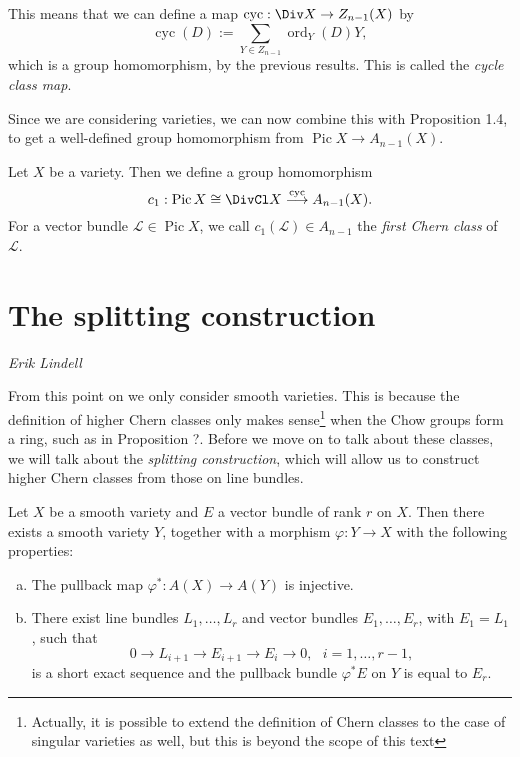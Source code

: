 \documentclass[a4paper,openany]{scrbook}
\DeclareMathOperator{\Pic}{Pic}
\DeclareMathOperator{\ord}{ord}
\newcommand{\chapterauthor}[1]{\hfill\emph{#1}\par\noindent}
\begin{document}
This means that we can define a map $\operatorname{cyc}:\Div X\to Z_{n-1}(X)$ by
$$\operatorname{cyc}(D):=\sum_{Y\in Z_{n-1}}\ord_Y(D)Y,$$
which is a group homomorphism, by the previous results. This is called the \textit{cycle class map}.

Since we are considering varieties, we can now combine this with Proposition 1.4, to get a well-defined group homomorphism from $\Pic X\to A_{n-1}(X)$.

\begin{dfn}
Let $X$ be a variety. Then we define a group homomorphism
$$c_1:\Pic X\cong\DivCl X\overset{\operatorname{cyc}}{\longrightarrow}A_{n-1}(X).$$
For a vector bundle $\mathscr{L}\in\Pic X$, we call $c_1(\mathscr{L})\in A_{n-1}$ the \textit{first Chern class} of $\mathscr{L}$.
\end{dfn}

\section{The splitting construction}
\chapterauthor{Erik Lindell}

From this point on we only consider smooth varieties. This is because the definition of higher Chern classes only makes sense\footnote{Actually, it is possible to extend the definition of Chern classes to the case of singular varieties as well, but this is beyond the scope of this text} when the Chow groups form a ring, such as in Proposition ?. Before we move on to talk about these classes, we will talk about the \textit{splitting construction}, which will allow us to construct higher Chern classes from those on line bundles. 

\begin{lemma}
Let $X$ be a smooth variety and $E$ a vector bundle of rank $r$ on $X$. Then there exists a smooth variety $Y$, together with a morphism $\varphi:Y\to X$ with the following properties:\begin{enumerate}[(a)]
    \item The pullback map $\varphi^*:A(X)\to A(Y)$ is injective.
    \item There exist line bundles $L_1,\ldots, L_r$ and vector bundles $E_1,\ldots, E_r$, with $E_1=L_1$, such that
     $$0\to L_{i+1}\to E_{i+1}\to E_i\to 0,\ \ \ i=1,\ldots, r-1,$$
     is a short exact sequence and the pullback bundle $\varphi^*E$ on $Y$ is equal to $E_r$.
\end{enumerate}
\end{lemma}
\end{document}

